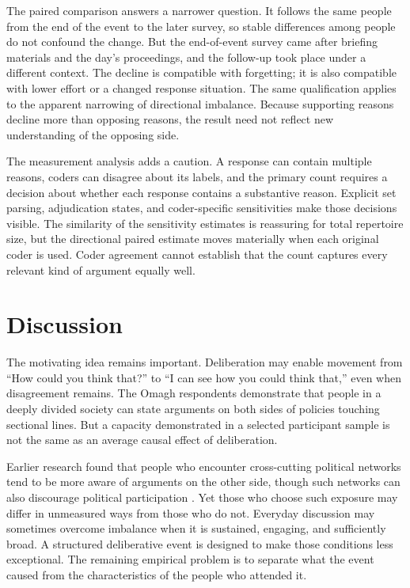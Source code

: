 \documentclass{article}
\begin{document}
The paired comparison answers a narrower question. It follows the same people from the end of
the event to the later survey, so stable differences among people do not confound the change.
But the end-of-event survey came after briefing materials and the day's proceedings, and the
follow-up took place under a different context. The decline is compatible with forgetting; it
is also compatible with lower effort or a changed response situation. The same qualification
applies to the apparent narrowing of directional imbalance. Because supporting reasons decline
more than opposing reasons, the result need not reflect new understanding of the opposing side.

The measurement analysis adds a caution. A response can contain multiple reasons, coders can
disagree about its labels, and the primary count requires a decision about whether each response
contains a substantive reason. Explicit set parsing, adjudication states, and coder-specific
sensitivities make those decisions visible. The similarity of the sensitivity estimates is
reassuring for total repertoire size, but the directional paired estimate moves materially when
each original coder is used. Coder agreement cannot establish that the count captures every
relevant kind of argument equally well.

\section{Discussion}

The motivating idea remains important. Deliberation may enable movement from ``How could you
think that?'' to ``I can see how you could think that,'' even when disagreement remains. The
Omagh respondents demonstrate that people in a deeply divided society can state arguments on
both sides of policies touching sectional lines. But a capacity demonstrated in a selected
participant sample is not the same as an average causal effect of deliberation.

Earlier research found that people who encounter cross-cutting political networks tend to be
more aware of arguments on the other side, though such networks can also discourage political
participation \citep{mutz2002cross,mutz2002consequences}. Yet those who choose such
exposure may differ in unmeasured ways from those who do not. Everyday discussion may
sometimes overcome imbalance when it is sustained, engaging, and sufficiently broad. A
structured deliberative event is designed to make those conditions less exceptional. The
remaining empirical problem is to separate what the event caused from the characteristics of
the people who attended it.
\end{document}
